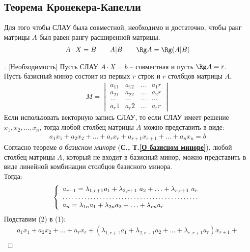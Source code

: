 \subsection{Теорема Кронекера-Капелли}
\begin{theorem}
Для того чтобы СЛАУ была совместной, необходимо и достаточно, чтобы ранг матрицы $A$ был равен рангу расширенной матрицы.
\begin{gather*}
A \cdot X = B \qquad A|B \qquad \Rg A = \Rg (A|B)
\end{gather*}
\end{theorem}
\begin{proof}[][Необходимость]
Пусть СЛАУ $A\cdot X = b$ -- совместная и пусть $\Rg A = r$.\\
Пусть базисный минор состоит из первых $r$ строк и $r$ столбцов матрицы $A$.
\begin{gather*}
M = \begin{vmatrix} 
a_11 & a_12 & \ldots & a_1r \\
a_21 & a_22 & \ldots & a_2r \\
\ldots & \ldots & \ldots & \ldots\\
a_r1 & a_r2 & \ldots & a_rr
\end{vmatrix} 
\end{gather*} 
Если использовать векторную запись СЛАУ, то если СЛАУ имеет решение $x_1, x_2, \ldots, x_n$, тогда любой столбец матрицы $A$ можно представить в виде:
\begin{gather}
a_1x_1 + a_2x_2 + \ldots + a_rx_r + a_{r+1}x_{r+1} + \ldots + a_nx_n = b
\end{gather}
Согласно теореме \textit{о базисном миноре} (\textbf{С.\pageref{О базисном миноре}, Т.\ref{О базисном миноре}}), любой столбец матрицы $A$, который не входит в базисный минор, можно представить в виде линейной комбинации столбцов базисного минора.\\
Тогда:
\begin{align}
\left\{ \begin{array}{l}
 a_{r+1} = \lambda_{1,r+1} a_1 + \lambda_{2,r+1}\ a_2 + \ldots + \lambda_{r, r+1}\ a_r \\
\hdotsfor{1} \\
 a_n = \lambda_{1n}a_1 + \lambda_{2n}a_2 + \ldots + \lambda_{rn}a_r
\end{array} \right.
\end{align}
Подставим (2) в (1):
\begin{multline*}
a_1x_1 + a_2x_2 + \ldots + a_rx_r + (\lambda_{1,r+1} a_1 + \lambda_{2,r+1} a_2 + \ldots + \lambda_{r, r+1}a_r)x_{r+1} + \\

\end{multline*}
\end{proof}
